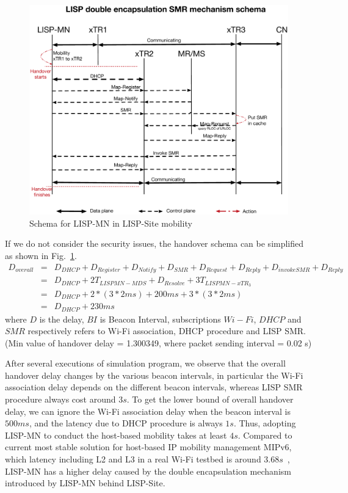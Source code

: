 \begin{figure}[!th]
	\centering
	\includegraphics[width=\textwidth]{Pics/Mobility_double_encap_schema_SMR_improving_simplify}
	\caption{Schema for LISP-MN in LISP-Site mobility}
	\label{Mobility_double_encap_schema_SMR_improving_simplify}
\end{figure}
If we do not consider the security issues, the handover schema can be simplified as shown in Fig.~\ref{Mobility_double_encap_schema_SMR_improving_simplify}.
\begin{eqnarray}
	D_{overall} &=& D_{DHCP} + D_{Register} + D_{Notify} + D_{SMR} + D_{Request} + D_{Reply} + D_{invokeSMR} + D_{Reply} \nonumber \\
	&=& D_{DHCP} + 2T_{LISPMN-MDS} + D_{Resolve} + 3T_{LISPMN-xTR_3} \nonumber \\
	&=& D_{DHCP} + 2* (3*2ms) + 200ms + 3*(3*2ms) \nonumber \\
	&=& D_{DHCP} + 230 ms
\end{eqnarray}
where $D$ is the delay, $BI$ is Beacon Interval, subscriptions $Wi-Fi$, $DHCP$ and $SMR$ respectively refers to Wi-Fi association, DHCP procedure and LISP SMR. (Min value of handover delay = 1.300349, where packet sending interval = 0.02 s) 

After several executions of simulation program, we observe that the overall handover delay changes by the various beacon intervals, in particular the Wi-Fi association delay depends on the different beacon intervals, whereas LISP SMR procedure always cost around $3s$. To get the lower bound of overall handover delay, we can ignore the Wi-Fi association delay when the beacon interval is $500ms$, and the latency due to DHCP procedure is always $1s$. Thus, adopting LISP-MN to conduct the host-based mobility takes at least $4s$. Compared to current most stable solution for host-based IP mobility management MIPv6, which latency including L2 and L3 in a real Wi-Fi testbed is around $3.68s$~\cite{vassiliou2010analysis}, LISP-MN has a higher delay caused by the double encapsulation mechanism introduced by LISP-MN behind LISP-Site. 

